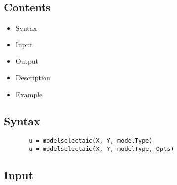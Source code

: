 \documentclass[a4paper,11pt,openany]{memoir}
\begin{document}
\subsection*{Contents}

\begin{itemize}
\setlength{\itemsep}{-1ex}
   \item Syntax
   \item Input
   \item Output
   \item Description
   \item Example
\end{itemize}


\subsection*{Syntax}


\begin{verbatim}       u = modelselectaic(X, Y, modelType)
       u = modelselectaic(X, Y, modelType, Opts)\end{verbatim}
    

\subsection*{Input}
\end{document}
